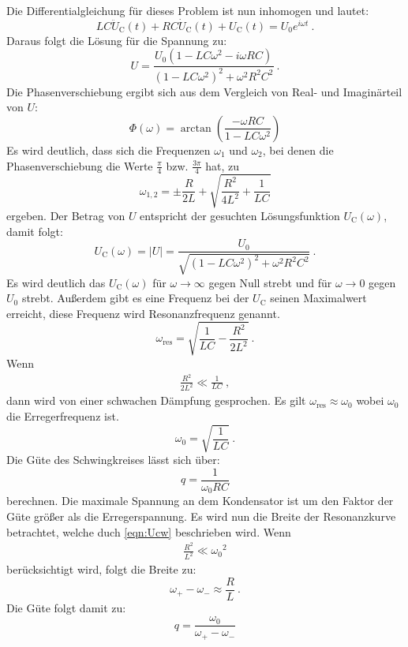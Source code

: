 Die Differentialgleichung für dieses Problem ist nun inhomogen und lautet:
\begin{equation}
	LC \ddot{U}_\text{C}(t) + RC \dot{U}_\text{C}(t) + U_\text{C}(t) = U_0 e^{i \omega t} \ .
\end{equation}
Daraus folgt die Lösung für die Spannung zu:
\begin{equation}
	U = \frac{U_0(1 - LC \omega^2 - i \omega RC)}{(1 - LC \omega^2)^2 + \omega^2 R^2 C^2} \ .
\end{equation}
Die Phasenverschiebung ergibt sich aus dem Vergleich von Real- und Imaginärteil von $U$:
\begin{equation}
	\Phi (\omega) = \arctan \left(\frac{-\omega RC}{1-LC\omega^2}  \right)
\end{equation}
Es wird deutlich, dass sich die Frequenzen $\omega_1$ und $\omega_2$, bei denen die Phasenverschiebung die Werte $\frac{\pi}{4}$ bzw. $\frac{3\pi}{4}$ hat, zu
\begin{equation}
	\omega_{1,2} = \pm \frac{R}{2L} + \sqrt{\frac{R^2}{4L^2} + \frac{1}{LC}}
\end{equation}
ergeben.
Der Betrag von $U$ entspricht der gesuchten Lösungsfunktion $U_\text{C}(\omega)$, damit folgt:
\begin{equation}
	U_\text{C}(\omega) = |U| = \frac{U_0}{\sqrt{(1 - LC \omega^2)^2 + \omega^2 R^2 C^2}} \ .
	\label{eqn:Ucw}
\end{equation}
Es wird deutlich das $U_\text{C}(\omega)$ für $\omega \to \infty$ gegen Null strebt und für $\omega \to 0$ gegen $U_0$ strebt. Außerdem gibt es eine Frequenz bei der $U_\text{C}$ seinen Maximalwert erreicht, diese Frequenz wird Resonanzfrequenz genannt.
\begin{equation}
	\omega_\text{res} = \sqrt{\frac{1}{LC} - \frac{R^2}{2L^2}} \ .
\end{equation}
Wenn
\begin{align*}
	\frac{R^2}{2L^2} \ll \frac{1}{LC} \ ,
\end{align*}
dann wird von einer schwachen Dämpfung gesprochen. Es gilt $\omega_\text{res} \approx \omega_0$ wobei $\omega_0$ die Erregerfrequenz ist.
\begin{equation}
	\omega_0 = \sqrt{\frac{1}{LC}} \ .
\end{equation}
Die Güte des Schwingkreises lässt sich über:
\begin{equation}
	q = \frac{1}{\omega_0 RC}
\end{equation}
berechnen. Die maximale Spannung an dem Kondensator ist um den Faktor der Güte größer als die Erregerspannung. Es wird nun die Breite der Resonanzkurve betrachtet, welche duch \ref{eqn:Ucw} beschrieben wird. Wenn
\begin{align*}
	\frac{R^2}{L^2} \ll {\omega_0}^2
\end{align*}
berücksichtigt wird, folgt die Breite zu:
\begin{equation}
	\omega_+ - \omega_- \approx \frac{R}{L} \ .
\end{equation}
Die Güte folgt damit zu:
\begin{equation}
	q = \frac{\omega_0}{\omega_+ - \omega_-}
\end{equation}


